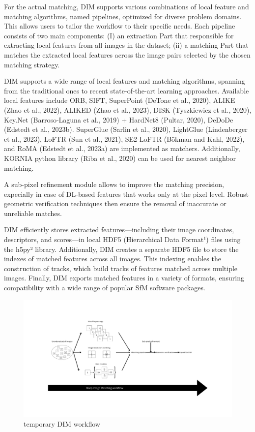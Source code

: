 For the actual matching, DIM supports various combinations of local feature and matching algorithms, named pipelines, optimized for diverse problem domains. This allows users to tailor the workflow to their specific needs. Each pipeline consists of two main components: (I) an extraction Part that responsible for extracting local features from all images in the dataset; (ii) a matching Part that matches the extracted local features across the image pairs selected by the chosen matching strategy.  

DIM supports a wide range of local features and matching algorithms, spanning from the traditional ones to recent state-of-the-art learning approaches. Available local features include ORB, SIFT, SuperPoint (DeTone et al., 2020), ALIKE (Zhao et al., 2022), ALIKED (Zhao et al., 2023), DISK (Tyszkiewicz et al., 2020), Key.Net (Barroso-Laguna et al., 2019) + HardNet8 (Pultar, 2020), DeDoDe (Edstedt et al., 2023b). SuperGlue (Sarlin et al., 2020), LightGlue (Lindenberger et al., 2023), LoFTR (Sun et al., 2021), SE2-LoFTR (Bökman and Kahl, 2022), and RoMA (Edstedt et al., 2023a) are implemented as matchers. Additionally, KORNIA python library (Riba et al., 2020) can be used for nearest neighbor matching. 

A sub-pixel refinement module allows to improve the matching precision, expecially in case of DL-based features that works only at the pixel level. Robust geometric verification techniques then ensure the removal of inaccurate or unreliable matches. 

DIM efficiently stores extracted features—including their image coordinates, descriptors, and scores—in local HDF5 (Hierarchical Data Format¹) files using the h5py² library. Additionally, DIM creates a separate HDF5 file to store the indexes of matched features across all images. This indexing enables the construction of tracks, which build tracks of features matched across multiple images. Finally, DIM exports matched features in a variety of formats, ensuring compatibility with a wide range of popular SfM software packages. 

\begin{figure}
    \centering
    \includegraphics[width=1\textwidth]{dim_workflow}
    \caption{temporary DIM workflow}
    \label{fig:5:dim_workflow}
\end{figure}

